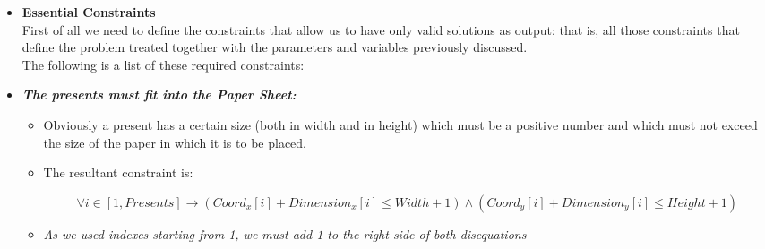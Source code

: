 \begin{itemize}
	\item[] \textbf{Essential Constraints}
	\\
	First of all we need to define the constraints that allow us to have only valid solutions as output: that is, all those constraints that define the problem treated together with the parameters and variables previously discussed.
	\\
	The following is a list of these required constraints:
	\item \textbf{\textit{The presents must fit into the Paper Sheet:}}
	\begin{itemize}
		\item[] Obviously a present has a certain size (both in width and in height) which must be a positive number and which must not exceed the size of the paper in which it is to be placed.
		\item[] The resultant constraint is:
		\begin{adjustwidth}{-3cm}{}\begin{equation*}
			\forall i \in [1, Presents] \rightarrow
			(Coord_x[i] + Dimension_x[i] \leq Width + 1) \wedge
			(Coord_y[i] + Dimension_y[i] \leq Height + 1)
		\end{equation*}\end{adjustwidth} 
		\item[] \textit{As we used indexes starting from 1, we must add 1 to the right side of both disequations} 
	\end{itemize}
	

\end{itemize}
